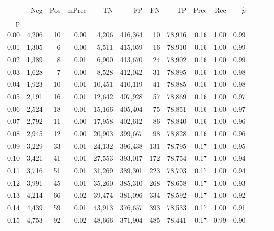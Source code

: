 \begin{tabular}{rrrrrrrrrrrrrr}
\toprule
{} &    Neg &    Pos & mPrec &       TN &       FP &      FN &      TP &  Prec &   Rec & $\hat{p}$ \\
p    &        &        &       &          &          &         &         &       &       &           \\
\midrule
0.00 &  4,206 &     10 &  0.00 &    4,206 &  416,364 &      10 &  78,916 &  0.16 &  1.00 &      0.99 \\
0.01 &  1,305 &      6 &  0.00 &    5,511 &  415,059 &      16 &  78,910 &  0.16 &  1.00 &      0.99 \\
0.02 &  1,389 &      8 &  0.01 &    6,900 &  413,670 &      24 &  78,902 &  0.16 &  1.00 &      0.99 \\
0.03 &  1,628 &      7 &  0.00 &    8,528 &  412,042 &      31 &  78,895 &  0.16 &  1.00 &      0.98 \\
0.04 &  1,923 &     10 &  0.01 &   10,451 &  410,119 &      41 &  78,885 &  0.16 &  1.00 &      0.98 \\
0.05 &  2,191 &     16 &  0.01 &   12,642 &  407,928 &      57 &  78,869 &  0.16 &  1.00 &      0.97 \\
0.06 &  2,524 &     18 &  0.01 &   15,166 &  405,404 &      75 &  78,851 &  0.16 &  1.00 &      0.97 \\
0.07 &  2,792 &     11 &  0.00 &   17,958 &  402,612 &      86 &  78,840 &  0.16 &  1.00 &      0.96 \\
0.08 &  2,945 &     12 &  0.00 &   20,903 &  399,667 &      98 &  78,828 &  0.16 &  1.00 &      0.96 \\
0.09 &  3,229 &     33 &  0.01 &   24,132 &  396,438 &     131 &  78,795 &  0.17 &  1.00 &      0.95 \\
0.10 &  3,421 &     41 &  0.01 &   27,553 &  393,017 &     172 &  78,754 &  0.17 &  1.00 &      0.94 \\
0.11 &  3,716 &     51 &  0.01 &   31,269 &  389,301 &     223 &  78,703 &  0.17 &  1.00 &      0.94 \\
0.12 &  3,991 &     45 &  0.01 &   35,260 &  385,310 &     268 &  78,658 &  0.17 &  1.00 &      0.93 \\
0.13 &  4,214 &     66 &  0.02 &   39,474 &  381,096 &     334 &  78,592 &  0.17 &  1.00 &      0.92 \\
0.14 &  4,439 &     59 &  0.01 &   43,913 &  376,657 &     393 &  78,533 &  0.17 &  1.00 &      0.91 \\
0.15 &  4,753 &     92 &  0.02 &   48,666 &  371,904 &     485 &  78,441 &  0.17 &  0.99 &      0.90 \\

\end{tabular}
